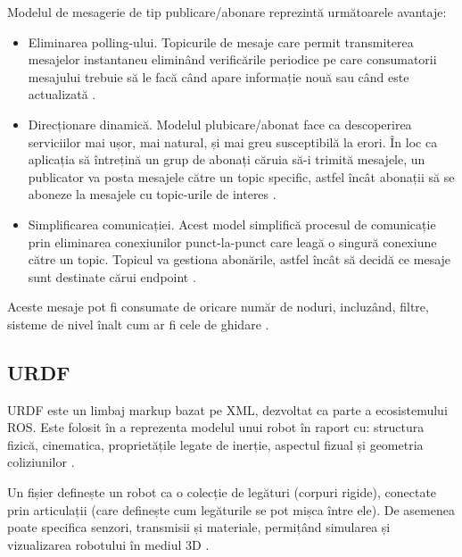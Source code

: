 Modelul de mesagerie de tip publicare/abonare reprezintă următoarele avantaje:
\begin{itemize}
	\item Eliminarea polling-ului. Topicurile de mesaje care permit transmiterea mesajelor instantaneu eliminând verificările periodice pe care consumatorii mesajului trebuie să le facă când apare informație nouă sau când este actualizată \cite{ps}.
	\item Direcționare dinamică. Modelul plubicare/abonat face ca descoperirea serviciilor mai ușor, mai natural, și mai greu susceptibilă la erori. În loc ca aplicația să întrețină un grup de abonați căruia să-i trimită mesajele, un publicator va posta mesajele către un topic specific, astfel încât abonații să se aboneze la mesajele cu topic-urile de interes \cite{ps}.
	\item Simplificarea comunicației. Acest model simplifică procesul de comunicație prin eliminarea conexiunilor punct-la-punct care leagă o singură conexiune către un topic. Topicul va gestiona abonările, astfel încât să decidă ce mesaje sunt destinate cărui endpoint \cite{ps}.
\end{itemize}

Aceste mesaje pot fi consumate de oricare număr de noduri, incluzând, filtre, sisteme de nivel înalt cum ar fi cele de ghidare \cite{ros}. 



\subsection{URDF}
URDF este un limbaj markup bazat pe XML, dezvoltat ca parte a ecosistemului ROS. Este folosit în a reprezenta modelul unui robot în raport cu: structura fizică, cinematica, proprietățile legate de inerție, aspectul fizual și geometria coliziunilor \cite{urdf}.

Un fișier definește un robot ca o colecție de legături (corpuri rigide), conectate prin articulații (care definește cum legăturile se pot mișca între ele). De asemenea poate specifica senzori, transmisii și materiale, permițând simularea și vizualizarea robotului în mediul 3D \cite{urdf}.

